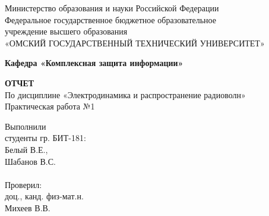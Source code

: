 \documentclass[14pt,a4paper]{scrartcl}
\begin{document}
  \begin{titlepage}                                                         
    \newpage                                                                        
    \begin{center}   
      Министерство образования и науки Российской Федерации  \\ 
      \vspace{1em}                                                    
      {\mdseries
        Федеральное государственное бюджетное образовательное \\
        учреждение высшего образования \\
        «ОМСКИЙ ГОСУДАРСТВЕННЫЙ ТЕХНИЧЕСКИЙ УНИВЕРСИТЕТ»
      }                               
      \vspace{1em}      

      {\bfseries Кафедра «Комплексная защита информации»}  

      \vspace{\fill}                                                         
                                   
      {\bfseries ОТЧЕТ } \\                                 
      По дисциплине «Электродинамика и распространение радиоволн» \\ 
      \vspace{1em} 
      Практическая работа №1 \\                                                           
    \end{center}                                                          
                                                                                        
    \vspace{\fill}                                                         
                                                                                        
    \hfill\parbox{5cm}{
      Выполнили\\
      студенты гр. БИТ-181:\\
      Белый В.Е., \\
      Шабанов В.С.\\
      \\
      Проверил:\\
      доц., канд. физ-мат.н. \\
      Михеев В.В.\\
    }                                                                                                                              
                                                                                                                                                                              

\end{titlepage}
\end{document}
